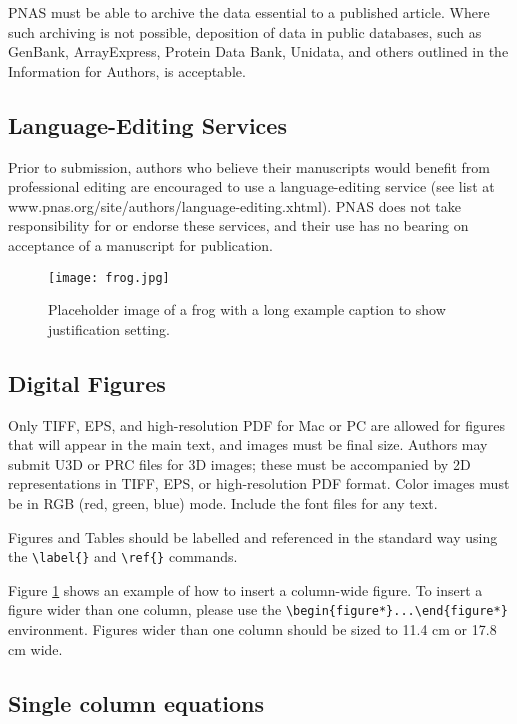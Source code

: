 \documentclass[9pt,twocolumn,twoside,lineno]{pnas-new}
\begin{document}
PNAS must be able to archive the data essential to a published article. Where such archiving is not possible, deposition of data in public databases, such as GenBank, ArrayExpress, Protein Data Bank, Unidata, and others outlined in the Information for Authors, is acceptable.

\subsection*{Language-Editing Services}
Prior to submission, authors who believe their manuscripts would benefit from professional editing are encouraged to use a language-editing service (see list at www.pnas.org/site/authors/language-editing.xhtml). PNAS does not take responsibility for or endorse these services, and their use has no bearing on acceptance of a manuscript for publication. 

\begin{figure}%
\centering
\texttt{[image: frog.jpg]}
\caption{Placeholder image of a frog with a long example caption to show justification setting.}
\label{fig:frog}
\end{figure}

\subsection*{Digital Figures}
\label{sec:figures}

Only TIFF, EPS, and high-resolution PDF for Mac or PC are allowed for figures that will appear in the main text, and images must be final size. Authors may submit U3D or PRC files for 3D images; these must be accompanied by 2D representations in TIFF, EPS, or high-resolution PDF format.  Color images must be in RGB (red, green, blue) mode. Include the font files for any text. 

Figures and Tables should be labelled and referenced in the standard way using the \verb|\label{}| and \verb|\ref{}| commands.

Figure \ref{fig:frog} shows an example of how to insert a column-wide figure. To insert a figure wider than one column, please use the \verb|\begin{figure*}...\end{figure*}| environment. Figures wider than one column should be sized to 11.4 cm or 17.8 cm wide.

\subsection*{Single column equations}
\end{document}

